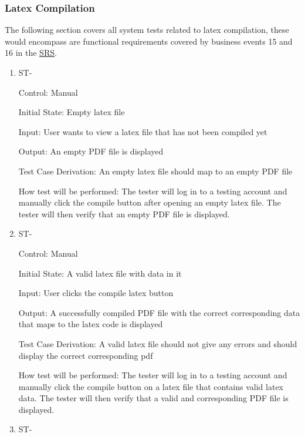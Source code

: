 \documentclass[12pt, titlepage]{article}
\newcounter{TESTID}
\newcommand\TESTNUM{\stepcounter{TESTID}\theTESTID}
\begin{document}
	\subsubsection{Latex Compilation}
	
	The following section covers all system tests related to latex compilation, these would encompass are functional requirements covered by business events 15 and 16 in the \href{https://github.com/RutheniumVI/UnderTree/blob/main/docs/SRS/SRS.pdf}{SRS}.
	
	\begin{enumerate}
		
		\item{ST-\TESTNUM\\}
		
		Control: Manual
		
		Initial State: Empty latex file
		
		Input: User wants to view a latex file that has not been compiled yet
		
		Output: An empty PDF file is displayed
		
		Test Case Derivation: An empty latex file should map to an empty PDF file
		
		How test will be performed: The tester will log in to a testing account and manually click the compile button after opening an empty latex file. The tester will then verify that an empty PDF file is displayed.
		
		\item{ST-\TESTNUM\\}
		
		Control: Manual
		
		Initial State: A valid latex file with data in it
		
		Input: User clicks the compile latex button
		
		Output: A successfully compiled PDF file with the correct corresponding data that maps to the latex code is displayed
		
		Test Case Derivation: A valid latex file should not give any errors and should display the correct corresponding pdf
		
		How test will be performed: The tester will log in to a testing account and manually click the compile button on a latex file that contains valid latex data. The tester will then verify that a valid and corresponding PDF file is displayed.
		
		\item{ST-\TESTNUM\\}
		

\end{enumerate}
\end{document}
